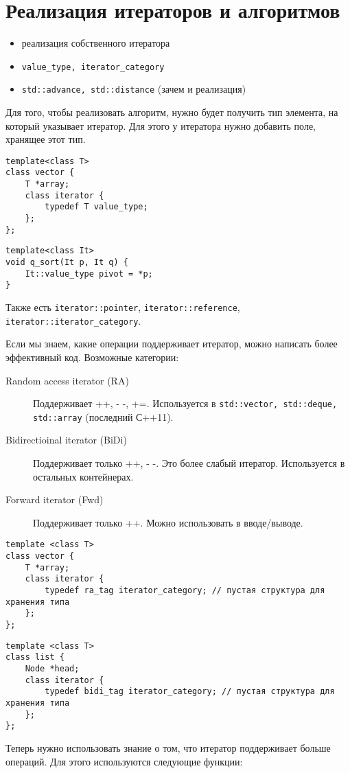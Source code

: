 \section{Реализация итераторов и алгоритмов}
\begin{itemize}[noitemsep]
	\item реализация собственного итератора
	\item \texttt{value\_type, iterator\_category}
	\item \texttt{std::advance, std::distance} (зачем и реализация)
\end{itemize}
Для того, чтобы реализовать алгоритм, нужно будет получить тип элемента, на который указывает итератор. Для этого у итератора нужно добавить поле, хранящее этот тип.
\begin{verbatim}
template<class T>
class vector {
    T *array;
	class iterator {
	    typedef T value_type;
	};
};
\end{verbatim}
\begin{verbatim}
template<class It>
void q_sort(It p, It q) {
    It::value_type pivot = *p;
}
\end{verbatim}
Также есть \texttt{iterator::pointer}, \texttt{iterator::reference}, \texttt{iterator::iterator\_category}.

Если мы знаем, какие операции поддерживает итератор, можно написать более эффективный код.
Возможные категории:
\begin{description}
	\item[Random access iterator (RA)] Поддерживает ++, - -, +=. Используется в \texttt{std::vector, std::deque, std::array} (последний С++11).
	\item[Bidirectioinal iterator (BiDi)] Поддерживает только ++, - -. Это более слабый итератор. Используется в остальных контейнерах.
	\item[Forward iterator (Fwd)] Поддерживает только ++. Можно использовать в вводе/выводе.
\end{description}
\begin{verbatim}
template <class T>
class vector {
    T *array;
	class iterator {
	    typedef ra_tag iterator_category; // пустая структура для хранения типа
	};
};
\end{verbatim}
\begin{verbatim}
template <class T>
class list {
	Node *head;
	class iterator {
	    typedef bidi_tag iterator_category; // пустая структура для хранения типа
	};
};
\end{verbatim}
Теперь нужно использовать знание о том, что итератор поддерживает больше операций. Для этого используются следующие функции:
